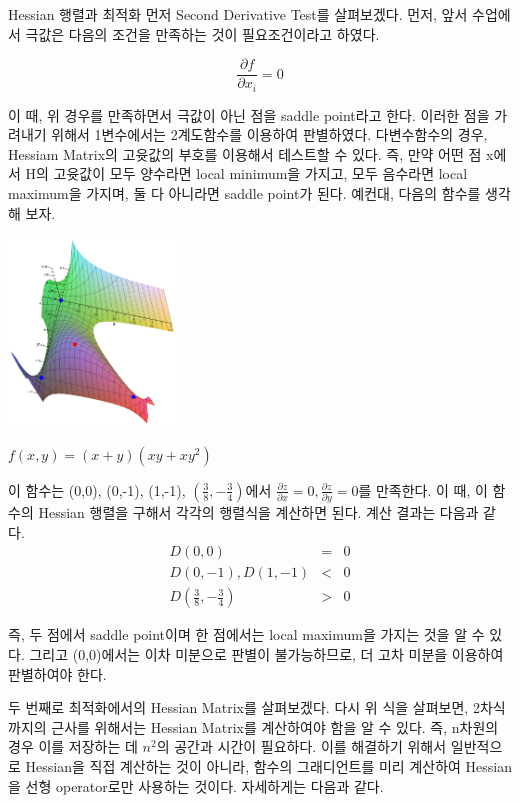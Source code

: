 \documentclass{beamer}
\begin{document}
\begin{frame}[allowframebreaks]{Hessian 행렬과 최적화}
먼저 Second Derivative Test를 살펴보겠다. 먼저, 앞서 수업에서 극값은 다음의 조건을 만족하는 것이 필요조건이라고 하였다. 

\begin{equation} 
\frac{\partial f }{\partial x_i} = 0
\end{equation}

이 때, 위 경우를 만족하면서 극값이 아닌 점을 saddle point라고 한다. 이러한 점을 가려내기 위해서 1변수에서는 2계도함수를 이용하여 판별하였다. 다변수함수의 경우, Hessiam Matrix의  고윳값의 부호를 이용해서 테스트할 수 있다. 즉, 만약 어떤 점 x에서 H의 고윳값이 모두 양수라면 local minimum을 가지고, 모두 음수라면 local maximum을 가지며, 둘 다 아니라면 saddle point가 된다. 예컨대, 다음의 함수를 생각해 보자. 

\includegraphics[height=5cm,keepaspectratio]{second}


$f(x,y) = (x+y)(xy+xy^2)$


이 함수는 (0,0), (0,-1), (1,-1), $(\frac{3}{8}, -\frac{3}{4})$에서 $\frac{\partial z}{\partial x} = 0, \frac{\partial z}{\partial y} = 0 $를 만족한다. 이 때, 이 함수의 Hessian 행렬을 구해서 각각의 행렬식을 계산하면 된다. 계산 결과는 다음과 같다. 
\begin{eqnarray}
D(0,0) &=& 0 \\
D(0,-1), D(1, -1) &<& 0\\
D(\frac{3}{8}, -\frac{3}{4}) &>&0
\end{eqnarray}

즉, 두 점에서 saddle point이며 한 점에서는 local maximum을 가지는 것을 알 수 있다. 그리고 (0,0)에서는 이차 미분으로 판별이 불가능하므로, 더 고차 미분을 이용하여 판별하여야 한다. 

두 번째로 최적화에서의 Hessian Matrix를 살펴보겠다. 다시 위 식을 살펴보면, 2차식까지의 근사를 위해서는 Hessian Matrix를 계산하여야 함을 알 수 있다. 즉, n차원의 경우 이를 저장하는 데 $n^2$의 공간과 시간이 필요하다. 이를 해결하기 위해서 일반적으로 Hessian을 직접 계산하는 것이 아니라, 함수의 그래디언트를 미리 계산하여 Hessian을 선형 operator로만 사용하는 것이다. 자세하게는 다음과 같다. 


\end{frame}
\end{document}
